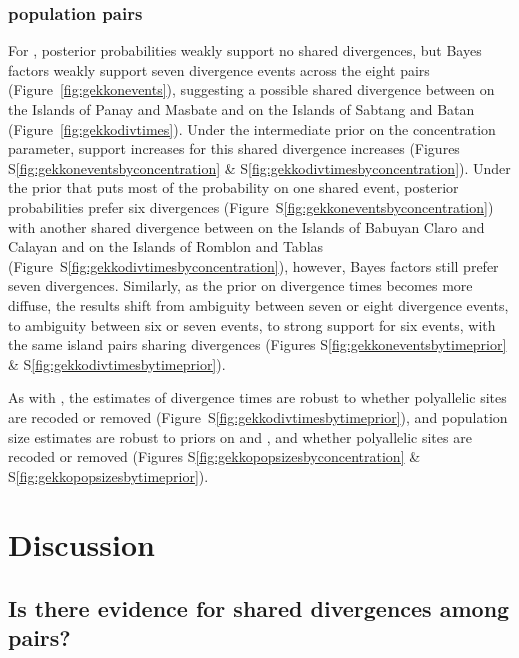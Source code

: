 \subsubsection{ population pairs}
For , posterior probabilities weakly support no shared divergences,
but Bayes factors weakly support seven divergence events across the eight pairs
(Figure~\ref{fig:gekkonevents}),
suggesting a possible shared divergence between
 on the Islands of Panay and Masbate
and
 on the Islands of Sabtang and Batan
(Figure~\ref{fig:gekkodivtimes}).
Under the intermediate prior on the concentration parameter, support
increases for this shared divergence increases 
(Figures
S\ref{fig:gekkoneventsbyconcentration}
\&
S\ref{fig:gekkodivtimesbyconcentration}).
Under the prior that puts most of the probability on one shared event,
posterior probabilities prefer six divergences
(Figure~S\ref{fig:gekkoneventsbyconcentration})
with another shared divergence between
 on the Islands of Babuyan Claro and Calayan
and
 on the Islands of Romblon and Tablas
(Figure~S\ref{fig:gekkodivtimesbyconcentration}), however,
Bayes factors still prefer seven divergences.
Similarly, as the prior on divergence times becomes more diffuse,
the results shift from ambiguity between seven or eight divergence
events, to ambiguity between six or seven events, to strong
support for six events, with the same island pairs sharing
divergences
(Figures
S\ref{fig:gekkoneventsbytimeprior}
\&
S\ref{fig:gekkodivtimesbytimeprior}).

\ifembed{

}{}

\ifembed{

}{}

As with , the estimates of divergence times
are robust to whether polyallelic sites are recoded or removed
(Figure~S\ref{fig:gekkodivtimesbytimeprior}),
and population size estimates are robust to 
priors on \concentration and \divtime, and whether polyallelic sites
are recoded or removed
(Figures
S\ref{fig:gekkopopsizesbyconcentration}
\&
S\ref{fig:gekkopopsizesbytimeprior}).

\section{Discussion}

\subsection{Is there evidence for shared divergences among  pairs?}

